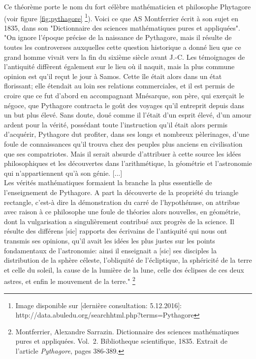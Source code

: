 \documentclass[a4paper,12pt]{article}
\begin{document}
\begin{remark}
Ce théorème porte le nom du fort célèbre mathématicien et philosophe Phytagore (voir figure  \ref{fig:pythagore} \footnote{Image disponible sur [dernière consultation: 5.12.2016]: http://data.abuledu.org/searchhtml.php?terms=Pythagore}). Voici ce que AS Montferrier écrit à son sujet en 1835, dans son "Dictionnaire des sciences mathématiques pures et appliquées".\\

"On ignore l’époque précise de la naissance de Pythagore, mais il résulte de toutes les controverses auxquelles cette question historique a donné lieu que ce grand homme vivait vers la fin du sixième siècle avant J.-C. Les témoignages de l’antiquité diffèrent également sur le lieu où il naquit, mais la plus commune opinion est qu’il reçut le jour à Samos. Cette île était alors dans un état florissant; elle étendait au loin ses relations commerciales, et il est permis de croire que ce fut d'abord en accompagnant Mnésarque, son père, qui exerçait le négoce, que Pythagore contracta le goût des voyages qu’il entreprit depuis dans un but
plus élevé. Sans doute, doué comme il l’était d’un esprit élevé, d’un amour ardent pour la vérité, possédant toute l'instruction qu’il était alors permis d’acquérir, Pythagore dut profiter, dans ses longs et nombreux pèlerinages, d’une foule de connaissances qu’il trouva chez des peuples plus anciens en civilisation que ses compatriotes. Mais il serait absurde d’attribuer à cette source les idées philosophiques et les découvertes dans l'arithmétique, la géométrie et l’astronomie qui n’appartiennent qu’à son génie.
[...]\\
Les vérités mathématiques formaient la branche la plus essentielle de l’enseignement de Pythagore. A part la découverte de la propriété du triangle rectangle, c’est-à dire la démonstration du carré de l’hypothénuse, on attribue avec raison à ce philosophe une foule de théories alors nouvelles, en géométrie, dont la vulgarisation a singulièrement contribué aux progrès de la science. Il résulte des différens [sic] rapports des écrivains de l’antiquité qui nous ont transmis ses opinions, qu’il avait les idées les plus justes sur les points fondamentaux de l’astronomie: ainsi il enseignait a [sic] ses disciples la distribution de la sphère céleste, l’obliquité de l’écliptique, la sphéricité de la terre et celle du soleil, la cause de la lumière de la lune, celle des éclipses de ces deux astres, et enfin le mouvement de la terre." \footnote{Montferrier, Alexandre Sarrazin. Dictionnaire des sciences mathématiques pures et appliquées. Vol.~2. Bibliotheque scientifique, 1835. Extrait de l'article \textit{Pythagore}, pages 386-389.}


\end{remark}
\end{document}
